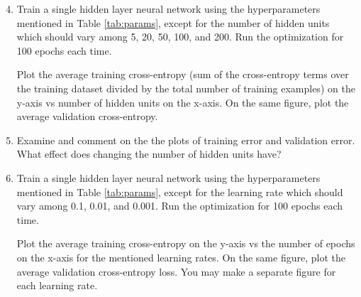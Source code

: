 \begin{enumerate}
\setcounter{enumi}{3}
\item {}  %
Train a single hidden layer neural network using the hyperparameters mentioned in Table \ref{tab:params}, except for the number of hidden units which should vary among 5, 20, 50, 100, and 200.  Run the optimization for 100 epochs each time.

Plot the average training cross-entropy (sum of the cross-entropy terms over the training dataset divided by the total number of training examples) on the y-axis vs number of hidden units on the x-axis. On the same figure, plot the average validation cross-entropy.

\begin{tcolorbox}[fit,height=11cm,blank, borderline={1pt}{-2pt},nobeforeafter]
\end{tcolorbox}

\item {} Examine and comment on the the plots of training error and validation error. What effect does changing the number of hidden units have?

\begin{tcolorbox}[fit,height=4cm,blank, borderline={1pt}{-2pt},nobeforeafter]
        \end{tcolorbox}
        
        
\item {} %
Train a single hidden layer neural network using the hyperparameters mentioned in Table \ref{tab:params}, except for the learning rate which should vary among 0.1, 0.01, and 0.001. Run the optimization for 100 epochs each time.

Plot the average training cross-entropy on the y-axis vs the number of epochs on the x-axis for the mentioned learning rates. On the same figure, plot the average validation cross-entropy loss. You may make a separate figure for each learning rate.

\begin{tcolorbox}[fit,height=13.5cm,blank, borderline={1pt}{-2pt},nobeforeafter]
\end{tcolorbox}



\end{enumerate}

